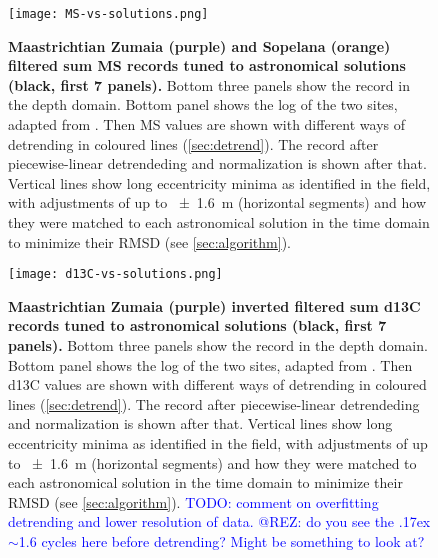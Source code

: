 \documentclass[draft]{agujournal2019}
\newcommand{\appr}{\raise.17ex\hbox{\(\scriptstyle\sim\)}} %
\newcommand{\ijk}{\textcolor{blue}}
\begin{document}
\begin{figure}
  \centering
  \texttt{[image: MS-vs-solutions.png]}
  \caption{\label{fig:rolling-age-MS}
    \textbf{Maastrichtian Zumaia (purple) and Sopelana (orange) filtered sum \gls{MS} records tuned to astronomical solutions (black, first 7 panels).}
    Bottom three panels show the record in the depth domain.
    Bottom panel shows the log of the two sites, adapted from .
    Then \gls{MS} values are shown with different ways of detrending in coloured lines (\cref{sec:detrend}).
    The record after piecewise-linear detrendeding and normalization is shown after that.
    Vertical lines show long eccentricity minima as identified in the field,
    with adjustments of up to \qty{\pm1.6}{\metre} (horizontal segments)
    and how they were matched to each astronomical solution in the time domain to minimize their \gls{RMSD} (see \cref{sec:algorithm}).
    }
\end{figure}

\begin{figure}
  \centering
  \texttt{[image: d13C-vs-solutions.png]}
  \caption{\label{fig:rolling-age-d13C}
    \textbf{Maastrichtian Zumaia (purple) inverted filtered sum \gls{d13C} records tuned to astronomical solutions (black, first 7 panels).}
    Bottom three panels show the record in the depth domain.
    Bottom panel shows the log of the two sites, adapted from .
    Then \gls{d13C} values are shown with different ways of detrending in coloured lines (\cref{sec:detrend}).
    The record after piecewise-linear detrendeding and normalization is shown after that.
    Vertical lines show long eccentricity minima as identified in the field,
    with adjustments of up to \qty{\pm1.6}{\metre} (horizontal segments)
    and how they were matched to each astronomical solution in the time domain to minimize their \gls{RMSD} (see \cref{sec:algorithm}).
    \ijk{TODO: comment on overfitting detrending and lower resolution of data.}
    \ijk{@REZ: do you see the \appr\qty{1.6}{\millionyear} cycles here before detrending? Might be something to look at?}
    }
\end{figure}
\end{document}
